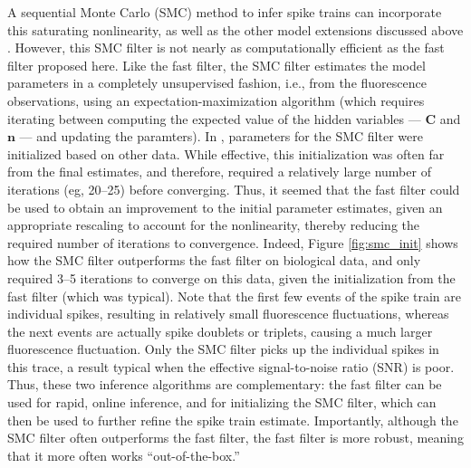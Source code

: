 \documentclass{article}
\providecommand{\ve}[1]{\boldsymbol{#1}}
\newcommand{\bn}{\ve{n}}
\newcommand{\bC}{\ve{C}}
\newcommand{\foopsi}{fast }
\begin{document}
A sequential Monte Carlo (SMC) method to infer spike trains can incorporate this saturating nonlinearity, as well as the other model extensions discussed above \cite{VogelsteinPaninski09} . However, this SMC filter is not nearly as computationally efficient as the fast filter proposed here.  Like the \foopsi filter, the SMC filter estimates the model parameters in a completely unsupervised fashion, i.e.,  from the fluorescence observations, using an expectation-maximization algorithm (which requires iterating between computing the expected value of the hidden variables --- $\bC$ and $\bn$ --- and updating the paramters).  In \cite{VogelsteinPaninski09}, parameters for the SMC filter were initialized based on other data.  While effective, this initialization was often far from the final estimates, and therefore, required a relatively large number of iterations (eg, 20--25) before converging.  Thus, it seemed that the \foopsi filter could be used to obtain an improvement to the initial parameter estimates, given an appropriate rescaling to account for the nonlinearity, thereby reducing the required number of iterations to convergence.  Indeed, Figure \ref{fig:smc_init} shows how the SMC filter outperforms the \foopsi filter on biological data, and only required 3--5 iterations to converge on this data, given the initialization from the \foopsi filter (which was typical).  Note that the first few events of the spike train are individual spikes, resulting in relatively small fluorescence fluctuations, whereas the next events are actually spike doublets or triplets, causing a much larger fluorescence fluctuation.  Only the SMC filter picks up the individual spikes in this trace, a result typical when the effective signal-to-noise ratio (SNR) is poor.  Thus, these two inference algorithms are complementary: the \foopsi filter can be used for rapid, online inference, and for initializing the SMC filter, which can then be used to further refine the spike train estimate.  Importantly, although the SMC filter often outperforms the \foopsi filter, the \foopsi filter is more robust, meaning that it more often works ``out-of-the-box.''
\end{document}
